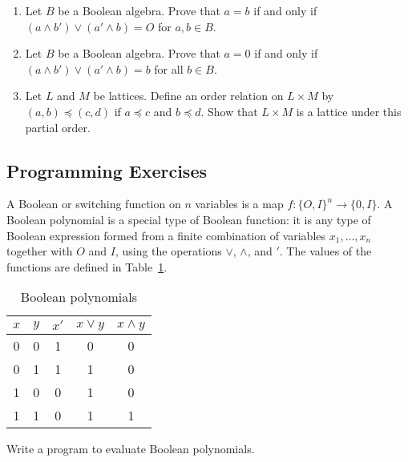 {\begin{enumerate}
 
\item
Let $B$ be a Boolean algebra. Prove that $a = b$ if and only if 
$(a \wedge b') \vee ( a' \wedge b) = O$ for $a, b \in B$.
 
\item
Let $B$ be a Boolean algebra. Prove that $a = 0$ if and only if 
$(a \wedge b') \vee ( a' \wedge b) = b$ for all $b \in B$.
 
\item
Let $L$ and $M$ be lattices. Define an order relation on $L \times M$
by $( a, b) \preceq (c, d)$ if $a \preceq c$ and $b \preceq d$. Show
that $L \times M$ is a lattice under this partial order.
 
\end{enumerate}
 
 
 
}
 
 
\subsection*{Programming Exercises}
 
{\small
 
 
A {\bfi Boolean\/} or
{\bfi switching function on $n$ variables\/} is a map $f : \{O, I\}^n
\rightarrow \{ 0, I\}$. A Boolean polynomial is a special type of
Boolean function: it is any type of Boolean expression formed from a
finite combination of variables $x_1, \ldots, x_n$ together with $O$
and $I$, using the operations $\vee$, $\wedge$, and $'$. The values of
the functions are defined in Table~\ref{BooleanPoly}. 
\begin{table} 
\caption{Boolean polynomials}{\small
\label{BooleanPoly}
\begin{center}
\begin{tabular}{|cc|ccc|}
\hline
$x$ & $y$ & $x'$ & $x \vee y$ & $x \wedge y$ \\ \hline
0   & 0   & 1    & 0          & 0            \\
0   & 1   & 1    & 1          & 0            \\
1   & 0   & 0    & 1          & 0            \\
1   & 1   & 0    & 1          & 1            \\
\hline
\end{tabular}
\end{center}
}
\end{table}
Write a program to evaluate Boolean polynomials.  
}
 
